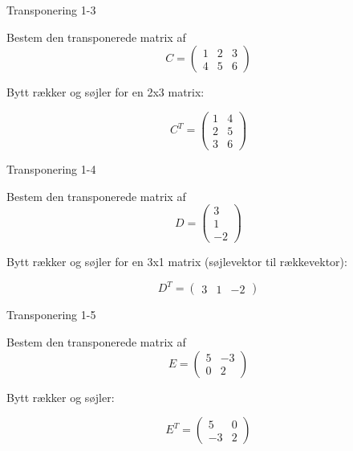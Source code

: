 \documentclass{article}
\begin{document}
\newpage

\begin{exercise}{Transponering 1-3}

Bestem den transponerede matrix af
\[
C = \begin{pmatrix} 1 & 2 & 3 \\ 4 & 5 & 6 \end{pmatrix}
\]


\hint

Bytt rækker og søjler for en 2x3 matrix:

\hint
\[
C^T = \begin{pmatrix} 1 & 4 \\ 2 & 5 \\ 3 & 6 \end{pmatrix}
\]

\end{exercise}

\newpage

\begin{exercise}{Transponering 1-4}

Bestem den transponerede matrix af
\[
D = \begin{pmatrix} 3 \\ 1 \\ -2 \end{pmatrix}
\]


\hint

Bytt rækker og søjler for en 3x1 matrix (søjlevektor til rækkevektor):

\hint
\[
D^T = \begin{pmatrix} 3 & 1 & -2 \end{pmatrix}
\]

\end{exercise}

\newpage

\begin{exercise}{Transponering 1-5}

Bestem den transponerede matrix af
\[
E = \begin{pmatrix} 5 & -3 \\ 0 & 2 \end{pmatrix}
\]


\hint

Bytt rækker og søjler:

\hint
\[
E^T = \begin{pmatrix} 5 & 0 \\ -3 & 2 \end{pmatrix}
\]

\end{exercise}
\end{document}
